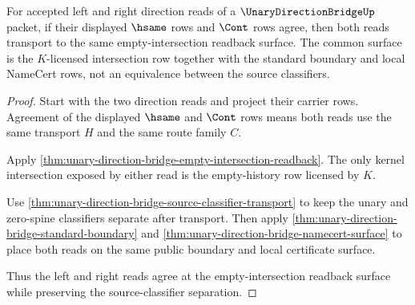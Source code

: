 \begin{theorem}
\label{thm:unary-direction-bridge-bidirectional-readback}
For accepted left and right direction reads of a $\UnaryDirectionBridgeUp$ packet, if their displayed $\hsame$ rows and $\Cont$ rows agree, then both reads transport to the same empty-intersection readback surface. The common surface is the $K$-licensed intersection row together with the standard boundary and local NameCert rows, not an equivalence between the source classifiers.
\end{theorem}
\begin{proof}
Start with the two direction reads and project their carrier rows. Agreement of the displayed $\hsame$ and $\Cont$ rows means both reads use the same transport $H$ and the same route family $C$.

Apply \autoref{thm:unary-direction-bridge-empty-intersection-readback}. The only kernel intersection exposed by either read is the empty-history row licensed by $K$.

Use \autoref{thm:unary-direction-bridge-source-classifier-transport} to keep the unary and zero-spine classifiers separate after transport. Then apply \autoref{thm:unary-direction-bridge-standard-boundary} and \autoref{thm:unary-direction-bridge-namecert-surface} to place both reads on the same public boundary and local certificate surface.

Thus the left and right reads agree at the empty-intersection readback surface while preserving the source-classifier separation.
\end{proof}

